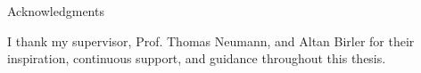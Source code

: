 \thispagestyle{empty}

\vspace*{20mm}

\begin{center}
    { Acknowledgments}
\end{center}

\vspace{10mm}

I thank my supervisor, Prof. Thomas Neumann, and Altan Birler for their inspiration, continuous support, and guidance throughout this thesis.

\cleardoublepage{}
